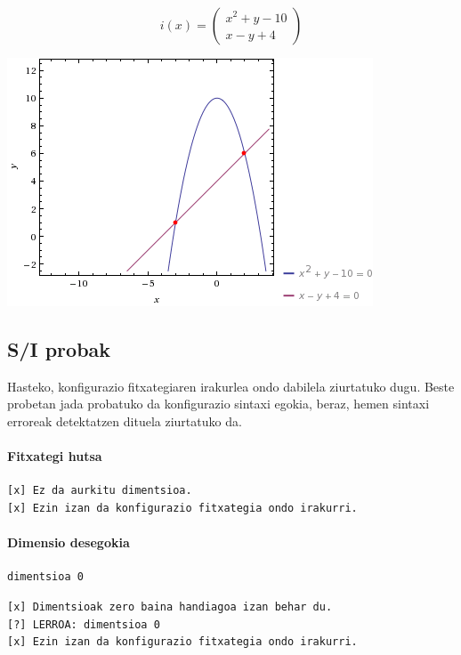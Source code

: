 \documentclass[10pt,a4paper,basque]{article}
\begin{document}
$$i(x) = \left(
\begin{array}{c}
x^2 + y - 10\\
x - y + 4
\end{array}
\right)$$

\begin{center}
\includegraphics[scale=0.5]{plot_ix.png}
\end{center}

\subsection{S/I probak}

Hasteko, konfigurazio fitxategiaren irakurlea ondo dabilela ziurtatuko dugu. Beste probetan jada probatuko da konfigurazio sintaxi egokia, beraz, hemen sintaxi erroreak detektatzen dituela ziurtatuko da.

\paragraph{Fitxategi hutsa}

\begin{verbatim}
[x] Ez da aurkitu dimentsioa.
[x] Ezin izan da konfigurazio fitxategia ondo irakurri.
\end{verbatim}

\paragraph{Dimensio desegokia}

\begin{verbatim}
dimentsioa 0
\end{verbatim}

\begin{verbatim}
[x] Dimentsioak zero baina handiagoa izan behar du.
[?] LERROA: dimentsioa 0
[x] Ezin izan da konfigurazio fitxategia ondo irakurri.
\end{verbatim}
\end{document}
